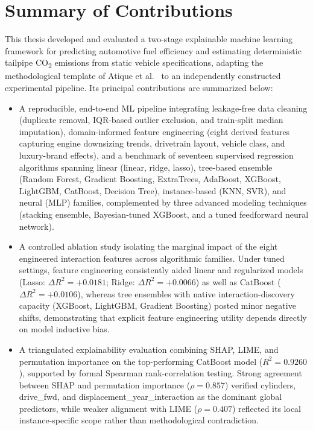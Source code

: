 \section{Summary of Contributions}

This thesis developed and evaluated a two-stage explainable machine learning framework for predicting automotive fuel efficiency and estimating deterministic tailpipe CO\textsubscript{2} emissions from static vehicle specifications, adapting the methodological template of Atique et al.~\cite{atique2026explainable} to an independently constructed experimental pipeline. Its principal contributions are summarized below:

\begin{itemize}
    \item A reproducible, end-to-end ML pipeline integrating leakage-free data cleaning (duplicate removal, IQR-based outlier exclusion, and train-split median imputation), domain-informed feature engineering (eight derived features capturing engine downsizing trends, drivetrain layout, vehicle class, and luxury-brand effects), and a benchmark of seventeen supervised regression algorithms spanning linear (linear, ridge, lasso), tree-based ensemble (Random Forest, Gradient Boosting, ExtraTrees, AdaBoost, XGBoost, LightGBM, CatBoost, Decision Tree), instance-based (KNN, SVR), and neural (MLP) families, complemented by three advanced modeling techniques (stacking ensemble, Bayesian-tuned XGBoost, and a tuned feedforward neural network).

    \item A controlled ablation study isolating the marginal impact of the eight engineered interaction features across algorithmic families. Under tuned settings, feature engineering consistently aided linear and regularized models (Lasso: \(\Delta R^2 = +0.0181\); Ridge: \(\Delta R^2 = +0.0066\)) as well as CatBoost (\(\Delta R^2 = +0.0106\)), whereas tree ensembles with native interaction-discovery capacity (XGBoost, LightGBM, Gradient Boosting) posted minor negative shifts, demonstrating that explicit feature engineering utility depends directly on model inductive bias.

    \item A triangulated explainability evaluation combining SHAP, LIME, and permutation importance on the top-performing CatBoost model (\(R^2 = 0.9260\)), supported by formal Spearman rank-correlation testing. Strong agreement between SHAP and permutation importance (\(\rho = 0.857\)) verified cylinders, drive\_fwd, and displacement\_year\_interaction as the dominant global predictors, while weaker alignment with LIME (\(\rho = 0.407\)) reflected its local instance-specific scope rather than methodological contradiction.


\end{itemize}
